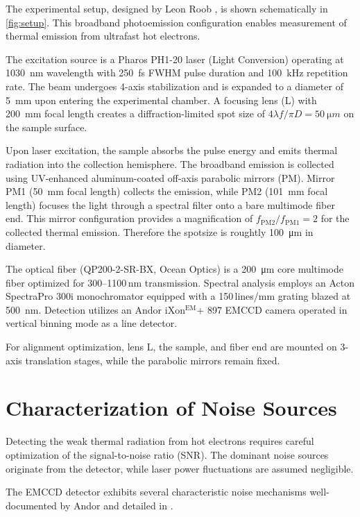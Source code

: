 \documentclass[
	parskip=half,
	a4paper,
]{scrarticle}
\begin{document}
The experimental setup, designed by Leon Roob \cite{roob_thermal_2025}, is shown schematically in \autoref{fig:setup}. This broadband photoemission configuration enables measurement of thermal emission from ultrafast hot electrons.

The excitation source is a Pharos PH1-20 laser (Light Conversion) operating at \SI{1030}{nm} wavelength with \SI{250}{fs} FWHM pulse duration and \SI{100}{kHz} repetition rate. The beam undergoes 4-axis stabilization and is expanded to a diameter of \SI{5}{mm} upon entering the experimental chamber. A focusing lens (L) with \SI{200}{mm} focal length creates a diffraction-limited spot size of $4\lambda f / \pi D = \SI{50}{\micro m}$ on the sample surface.

Upon laser excitation, the sample absorbs the pulse energy and emits thermal radiation into the collection hemisphere. The broadband emission is collected using UV-enhanced aluminum-coated off-axis parabolic mirrors (PM). Mirror PM1 (\SI{50}{mm} focal length) collects the emission, while PM2 (\SI{101}{mm} focal length) focuses the light through a spectral filter onto a bare multimode fiber end.
This mirror configuration provides a magnification of $f_\text{PM2}/f_\text{PM1} = 2$ for the collected thermal emission. Therefore the spotsize is roughtly \SI{100}{\micro m} in diameter.

The optical fiber (QP200-2-SR-BX, Ocean Optics) is a \SI{200}{\micro m} core multimode fiber optimized for 300--1100\,nm transmission. Spectral analysis employs an Acton SpectraPro 300i monochromator equipped with a 150\,lines/mm grating blazed at \SI{500}{nm}. Detection utilizes an Andor iXon$^\text{EM}$+ 897 EMCCD camera operated in vertical binning mode as a line detector.

For alignment optimization, lens L, the sample, and fiber end are mounted on 3-axis translation stages, while the parabolic mirrors remain fixed.

\section{Characterization of Noise Sources}

Detecting the weak thermal radiation from hot electrons requires careful optimization of the signal-to-noise ratio (SNR). The dominant noise sources originate from the detector, while laser power fluctuations are assumed negligible.

The EMCCD detector exhibits several characteristic noise mechanisms well-documented by Andor \cite{andor_establishing_nodate,dr_jo_walters_sensitivity_2023} and detailed in \cite{european_machine_vision_association_standard_2010}.
\end{document}
